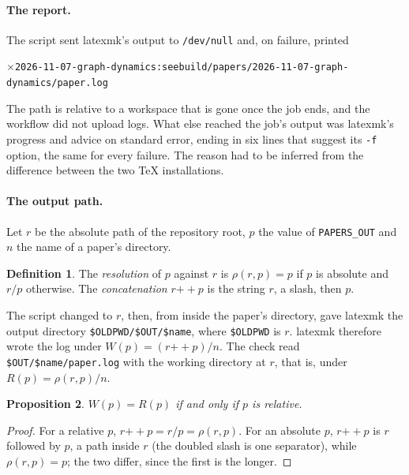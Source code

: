 \documentclass[11pt]{article}
\theoremstyle{plain}
\newtheorem{proposition}{Proposition}[section]
\theoremstyle{definition}
\newtheorem{definition}[proposition]{Definition}
\newcommand{\code}[1]{\texttt{#1}}
\newcommand{\fail}{\(\times\)}
\newcommand{\concat}{\mathbin{+\!\!+}}
\begin{document}
\paragraph{The report.} The script sent latexmk's output to \code{/dev/null} and, on failure,
printed
\begin{small}
\begin{alltt}
\fail{} 2026-11-07-graph-dynamics: see build/papers/2026-11-07-graph-dynamics/paper.log
\end{alltt}
\end{small}
The path is relative to a workspace that is gone once the job ends, and the workflow did not upload
logs. What else reached the job's output was latexmk's progress and advice on standard error,
ending in six lines that suggest its \code{-f} option, the same for every failure. The reason had to
be inferred from the difference between the two TeX installations.

\paragraph{The output path.} Let $r$ be the absolute path of the repository root, $p$ the value of
\code{PAPERS\_OUT} and $n$ the name of a paper's directory.

\begin{definition}
The \emph{resolution} of $p$ against $r$ is $\rho(r,p) = p$ if $p$ is absolute and $r/p$
otherwise. The \emph{concatenation} $r \concat p$ is the string $r$, a slash, then $p$.
\end{definition}

The script changed to $r$, then, from inside the paper's directory, gave latexmk the output
directory \code{\$OLDPWD/\$OUT/\$name}, where \code{\$OLDPWD} is $r$. latexmk therefore wrote the
log under $W(p) = (r \concat p)/n$. The check read \code{\$OUT/\$name/paper.log} with the working
directory at $r$, that is, under $R(p) = \rho(r,p)/n$.

\begin{proposition}\label{prop:paths}
$W(p) = R(p)$ if and only if $p$ is relative.
\end{proposition}

\begin{proof}
For a relative $p$, $r \concat p = r/p = \rho(r,p)$. For an absolute $p$, $r \concat p$ is $r$
followed by $p$, a path inside $r$ (the doubled slash is one separator), while $\rho(r,p) = p$;
the two differ, since the first is the longer.
\end{proof}
\end{document}

